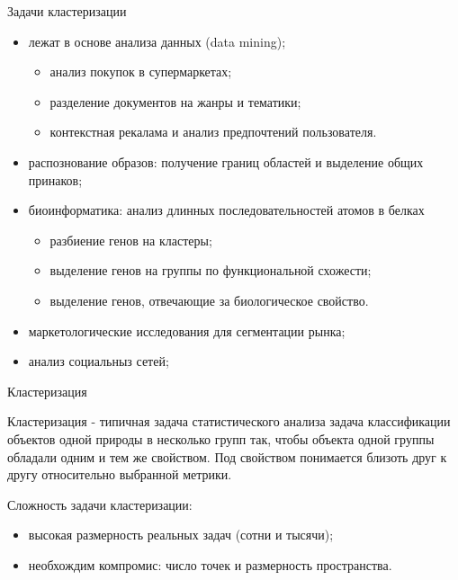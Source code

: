 \documentclass{beamer}
\begin{document}
\begin{frame}{Задачи кластеризации}
\begin{itemize}
\item лежат в основе анализа данных (data mining);
	\begin{itemize}
	\item анализ покупок в супермаркетах;
	\item разделение документов на жанры и тематики;
	\item контекстная рекалама и анализ предпочтений пользователя.	
	\end{itemize}
\item распознование образов: получение границ областей и выделение общих принаков;
\item биоинформатика: анализ длинных последовательностей атомов в белках 	
	\begin{itemize}
	\item разбиение генов на кластеры;
	\item выделение генов на группы по функциональной схожести;
	\item выделение генов, отвечающие за биологическое свойство.	
	\end{itemize}
\item маркетологические исследования для сегментации рынка;	
\item анализ социальныз сетей;
\end{itemize}
\end{frame}

\begin{frame}{Кластеризация}
\begin{block}{Кластеризация - типичная задача статистического анализа}
задача классификации объектов одной природы в несколько групп так, чтобы объекта одной группы обладали
одним и тем же свойством. Под свойством понимается близоть друг к другу относительно выбранной метрики.
\end{block}
Сложность задачи кластеризации:
\begin{itemize}
\item высокая размерность реальных задач (сотни и тысячи);
\item необхождим компромис: число точек и размерность пространства.
\end{itemize}
\end{frame}
\end{document}
